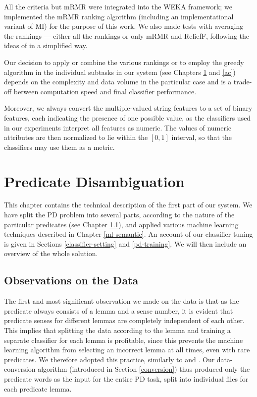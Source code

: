 \documentclass[12pt,notitlepage]{report}
\begin{document}
All the criteria but mRMR were integrated into the WEKA framework; we implemented the mRMR ranking algorithm (including an implementational variant of MI) for the purpose of this work. We also made tests with averaging the rankings --- either all the rankings or only mRMR and ReliefF, following the ideas of \citet{zhang08} in a simplified way.

Our decision to apply or combine the various rankings or to employ the greedy algorithm in the individual subtasks in our system (see Chapters \ref{pd} and \ref{ac}) depends on the complexity and data volume in the particular case and is a trade-off between computation speed and final classifier performance.

Moreover, we always convert the multiple-valued string features to a set of binary features, each indicating the presence of one possible value, as the classifiers used in our experiments interpret all features as numeric. The values of numeric attributes are then normalized \citep[p. 56f.]{witten05} to lie within the $[0,1]$ interval, so that the classifiers may use them as a metric.
 
\chapter{Predicate Disambiguation}\label{pd}

This chapter contains the technical description of the first part of our system. We have split the PD problem into several parts, according to the nature of the particular predicates (see Chapter \ref{pd-observe}), and applied various machine learning techniques described in Chapter \ref{ml-semantic}. An account of our classifier tuning is given in Sections \ref{classifier-setting} and \ref{pd-training}. We will then include an overview of the whole solution.

\section{Observations on the Data}\label{pd-observe}

The first and most significant observation we made on the data is that as the predicate always consists of a lemma and a sense number, it is evident that predicate senses for different lemmas are completely independent of each other. This implies that splitting the data according to the lemma and training a separate classifier for each lemma is profitable, since this prevents the machine learning algorithm from selecting an incorrect lemma at all times, even with rare predicates. We therefore adopted this practice, similarly to \citet{che09} and \citet{nugues09}. Our data-conversion algorithm (introduced in Section \ref{conversion}) thus produced only the predicate words as the input for the entire PD task, split into individual files for each predicate lemma. 
\end{document}
